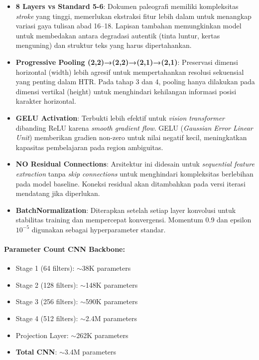 \begin{itemize}[nosep]
    \item \textbf{8 Layers vs Standard 5-6}: Dokumen paleografi memiliki kompleksitas \textit{stroke} yang tinggi, memerlukan ekstraksi fitur lebih dalam untuk menangkap variasi gaya tulisan abad 16--18. Lapisan tambahan memungkinkan model untuk membedakan antara degradasi autentik (tinta luntur, kertas menguning) dan struktur teks yang harus dipertahankan.
    
    \item \textbf{Progressive Pooling (2,2)→(2,2)→(2,1)→(2,1)}: Preservasi dimensi horizontal (width) lebih agresif untuk mempertahankan resolusi sekuensial yang penting dalam HTR. Pada tahap 3 dan 4, pooling hanya dilakukan pada dimensi vertikal (height) untuk menghindari kehilangan informasi posisi karakter horizontal.
    
    \item \textbf{GELU Activation}: Terbukti lebih efektif untuk \textit{vision transformer} dibanding ReLU karena \textit{smooth gradient flow}. GELU (\textit{Gaussian Error Linear Unit}) memberikan gradien non-zero untuk nilai negatif kecil, meningkatkan kapasitas pembelajaran pada region ambiguitas.
    
    \item \textbf{NO Residual Connections}: Arsitektur ini didesain untuk \textit{sequential feature extraction} tanpa \textit{skip connections} untuk menghindari kompleksitas berlebihan pada model baseline. Koneksi residual akan ditambahkan pada versi iterasi mendatang jika diperlukan.
    
    \item \textbf{BatchNormalization}: Diterapkan setelah setiap layer konvolusi untuk stabilitas training dan mempercepat konvergensi. Momentum 0.9 dan epsilon $10^{-5}$ digunakan sebagai hyperparameter standar.
\end{itemize}

\paragraph{Parameter Count CNN Backbone:}

\begin{itemize}[nosep]
    \item Stage 1 (64 filters): $\sim$38K parameters
    \item Stage 2 (128 filters): $\sim$148K parameters
    \item Stage 3 (256 filters): $\sim$590K parameters
    \item Stage 4 (512 filters): $\sim$2.4M parameters
    \item Projection Layer: $\sim$262K parameters
    \item \textbf{Total CNN}: $\sim$3.4M parameters
\end{itemize}

